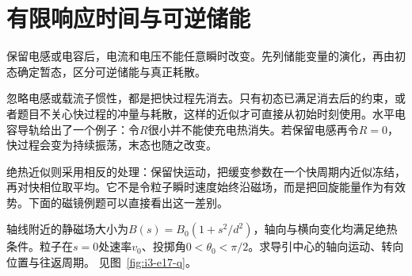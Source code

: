 \section{有限响应时间与可逆储能}\label{sec:i3-finite}
保留电感或电容后，电流和电压不能任意瞬时改变。先列储能变量的演化，再由初态确定暂态，区分可逆储能与真正耗散。

忽略电感或载流子惯性，都是把快过程先消去。只有初态已满足消去后的约束，或者题目不关心快过程的冲量与耗散，这样的近似才可直接从初始时刻使用。水平电容导轨给出了一个例子：令$R$很小并不能使充电热消失。若保留电感再令$R=0$，快过程会变为持续振荡，末态也随之改变。

绝热近似则采用相反的处理：保留快运动，把缓变参数在一个快周期内近似冻结，再对快相位取平均。它不是令粒子瞬时速度始终沿磁场，而是把回旋能量作为有效势。下面的磁镜例题可以直接看出这一差别。


\begin{example}[二次磁镜中的反弹周期]\label{ex:i3-e17}

轴线附近的静磁场大小为$B(s)=B_0(1+s^2/d^2)$，轴向与横向变化均满足绝热条件。粒子在$s=0$处速率$v_0$、投掷角$0<\theta_0<\pi/2$。求导引中心的轴向运动、转向位置与往返周期。
 见图~\ref{fig:i3-e17-q}。
\end{example}

